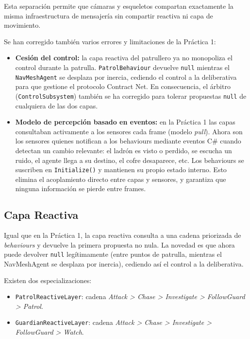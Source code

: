 \documentclass[a4paper,12pt]{article}
\begin{document}
Esta separación permite que cámaras y esqueletos compartan exactamente la misma infraestructura de mensajería sin compartir reactiva ni capa de movimiento.

Se han corregido también varios errores y limitaciones de la Práctica 1:

\begin{itemize}
    \item \textbf{Cesión del control:} la capa reactiva del patrullero ya no
    monopoliza el control durante la patrulla. \texttt{PatrolBehaviour} devuelve \texttt{null}
    mientras el \texttt{NavMeshAgent} se desplaza por inercia, cediendo el control a la
    deliberativa para que gestione el protocolo Contract Net. En consecuencia, el árbitro
    (\texttt{ControlSubsystem}) también se ha corregido para tolerar propuestas \texttt{null}
    de cualquiera de las dos capas.

    \item \textbf{Modelo de percepción basado en eventos:} en la Práctica 1 las capas
    consultaban activamente a los sensores cada frame (modelo \textit{pull}). Ahora son los
    sensores quienes notifican a los behaviours mediante eventos C\# cuando detectan un cambio
    relevante: el ladrón es visto o perdido, se escucha un ruido, el agente llega a su destino,
    el cofre desaparece, etc. Los behaviours se suscriben en \texttt{Initialize()} y mantienen
    su propio estado interno. Esto elimina el acoplamiento directo entre capas y sensores, y
    garantiza que ninguna información se pierde entre frames.
\end{itemize}

\subsection*{Capa Reactiva}

Igual que en la Práctica 1, la capa reactiva consulta a una cadena priorizada de \textit{behaviours} y devuelve la primera propuesta no nula. La novedad es que ahora puede devolver \texttt{null} legítimamente (entre puntos de patrulla, mientras el NavMeshAgent se desplaza por inercia), cediendo así el control a la deliberativa.

Existen dos especializaciones:

\begin{itemize}
    \item \texttt{PatrolReactiveLayer}: cadena \textit{Attack > Chase > Investigate > FollowGuard > Patrol}.
    \item \texttt{GuardianReactiveLayer}: cadena \textit{Attack > Chase > Investigate > FollowGuard > Watch}.
\end{itemize}
\end{document}
